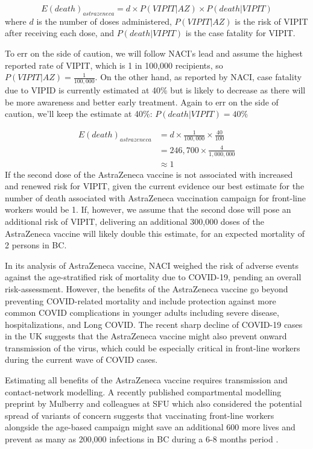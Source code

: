 \documentclass[]{interact}
\theoremstyle{plain}%
\theoremstyle{definition}
\theoremstyle{remark}
\begin{document}
\[
E(death)_{astrazeneca}  = d \times P(VIPIT|AZ) \times P(death|VIPIT)
\] where \(d\) is the number of doses administered, \(P(VIPIT|AZ)\) is
the risk of VIPIT after receiving each dose, and \(P(death|VIPIT)\) is
the case fatality for VIPIT.

To err on the side of caution, we will follow NACI's lead and assume the
highest reported rate of VIPIT, which is 1 in 100,000 recipients, so
\(P(VIPIT|AZ) = \frac{1}{100,000}\). On the other hand, as reported by
NACI, case fatality due to VIPID is currently estimated at 40\% but is
likely to decrease as there will be more awareness and better early
treatment. Again to err on the side of caution, we'll keep the estimate
at 40\%: \(P(death|VIPIT)=40\%\)

\[
\begin{aligned}
E(death)_{astrazeneca} & = d \times \frac{1}{100,000} \times \frac{40}{100} \\
& = 246,700 \times \frac{4}{1,000,000} \\
& \approx 1  
\end{aligned}
\] If the second dose of the AstraZeneca vaccine is not associated with
increased and renewed risk for VIPIT, given the current evidence our
best estimate for the number of death associated with AstraZeneca
vaccination campaign for front-line workers would be 1. If, however, we
assume that the second dose will pose an additional risk of VIPIT,
delivering an additional 300,000 doses of the AstraZeneca vaccine will
likely double this estimate, for an expected mortality of 2 persons in
BC.

In its analysis of AstraZeneca vaccine, NACI weighed the risk of adverse
events against the age-stratified risk of mortality due to COVID-19,
pending an overall risk-assessment. However, the benefits of the
AstraZeneca vaccine go beyond preventing COVID-related mortality and
include protection against more common COVID complications in younger
adults including severe disease, hospitalizations, and Long COVID. The
recent sharp decline of COVID-19 cases in the UK suggests that the
AstraZeneca vaccine might also prevent onward transmission of the virus,
which could be especially critical in front-line workers during the
current wave of COVID cases.

Estimating all benefits of the AstraZeneca vaccine requires transmission
and contact-network modelling. A recently published compartmental
modelling preprint by Mulberry and colleagues at SFU which also
considered the potential spread of variants of concern suggests that
vaccinating front-line workers alongside the age-based campaign might
save an additional 600 more lives and prevent as many as 200,000
infections in BC during a 6-8 months period
\citep{mulberry_vaccine_2021}.
\end{document}
